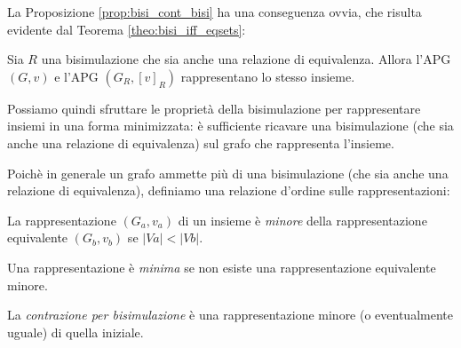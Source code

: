 La Proposizione \ref{prop:bisi_cont_bisi} ha una conseguenza ovvia, che risulta evidente dal Teorema \ref{theo:bisi_iff_eqsets}:
\begin{corollary}
    Sia $R$ una bisimulazione che sia anche una relazione di equivalenza. Allora l'APG $(G, v)$ e l'APG $(G_R, [v]_R)$ rappresentano lo stesso insieme.
\end{corollary}

Possiamo quindi sfruttare le proprietà della bisimulazione per rappresentare insiemi in una forma minimizzata: è sufficiente ricavare una bisimulazione (che sia anche una relazione di equivalenza) sul grafo che rappresenta l'insieme.

Poichè in generale un grafo ammette più di una bisimulazione (che sia anche una relazione di equivalenza), definiamo una relazione d'ordine sulle rappresentazioni:
\begin{definition}
    La rappresentazione $(G_a, v_a)$ di un insieme è \emph{minore} della rappresentazione equivalente $(G_b, v_b)$ se $|Va| < |Vb|$.

    Una rappresentazione è \emph{minima} se non esiste una rappresentazione equivalente minore.
\end{definition}

\begin{observation}
    La \emph{contrazione per bisimulazione} è una rappresentazione minore (o eventualmente uguale) di quella iniziale.
\end{observation}

